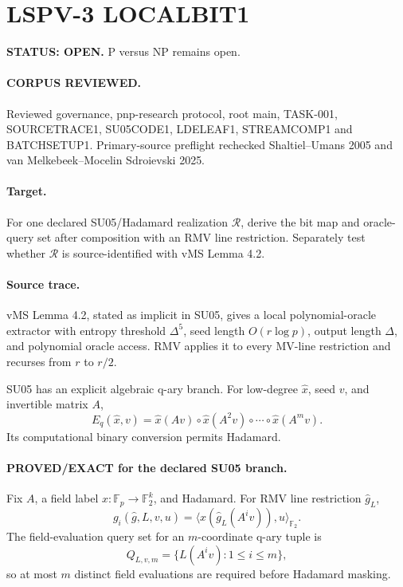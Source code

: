 \documentclass[11pt]{article}
\begin{document}
\section*{LSPV-3 LOCALBIT1}
\textbf{STATUS: OPEN.} P versus NP remains open.

\paragraph{CORPUS REVIEWED.}
Reviewed governance, pnp-research protocol, root main, TASK-001, SOURCETRACE1, SU05CODE1, LDELEAF1, STREAMCOMP1 and BATCHSETUP1. Primary-source preflight rechecked Shaltiel--Umans 2005 and van Melkebeek--Mocelin Sdroievski 2025.

\paragraph{Target.}
For one declared SU05/Hadamard realization \(\mathcal R\), derive the bit map and oracle-query set after composition with an RMV line restriction. Separately test whether \(\mathcal R\) is source-identified with vMS Lemma 4.2.

\paragraph{Source trace.}
vMS Lemma 4.2, stated as implicit in SU05, gives a local polynomial-oracle extractor with entropy threshold \(\Delta^5\), seed length \(O(r\log p)\), output length \(\Delta\), and polynomial oracle access. RMV applies it to every MV-line restriction and recurses from \(r\) to \(r/2\).

SU05 has an explicit algebraic q-ary branch. For low-degree \(\widehat x\), seed \(v\), and invertible matrix \(A\),
\[
E_q(\widehat x,v)=
\widehat x(Av)\circ\widehat x(A^2v)\circ\cdots\circ\widehat x(A^mv).
\]
Its computational binary conversion permits Hadamard.

\paragraph{PROVED/EXACT for the declared SU05 branch.}
Fix \(A\), a field label \(x:\mathbb F_p\to\mathbb F_2^k\), and Hadamard. For RMV line restriction \(\widehat g_L\),
\[
\boxed{g_i(\widehat g,L,v,u)=
\langle x(\widehat g_L(A^iv)),u\rangle_{\mathbb F_2}.}
\]
The field-evaluation query set for an \(m\)-coordinate q-ary tuple is
\[
\boxed{Q_{L,v,m}=\{L(A^iv):1\le i\le m\},}
\]
so at most \(m\) distinct field evaluations are required before Hadamard masking.
\end{document}
